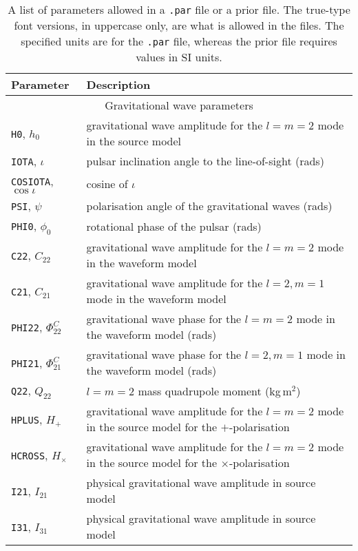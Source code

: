 \begin{longtable}{l|l}
\caption{A list of parameters allowed in a {\tt .par} file or a prior file. The true-type font versions, in uppercase only,
are what is allowed in the files. The specified units are for the {\tt .par} file, whereas the prior file
requires values in SI units.}\label{tab:paramlist} \\
Parameter & Description \\
\hline
\multicolumn{2}{c}{Gravitational wave parameters} \\
\hline
{\tt H0}, $h_0$      & gravitational wave amplitude for the $l=m=2$ mode in the source model \\
{\tt IOTA}, $\iota$  & pulsar inclination angle to the line-of-sight (rads) \\
{\tt COSIOTA}, $\cos{\iota}$ & cosine of $\iota$ \\
{\tt PSI}, $\psi$    & polarisation angle of the gravitational waves (rads) \\
{\tt PHI0}, $\phi_0$ & rotational phase of the pulsar (rads) \\
{\tt C22}, $C_{22}$  & gravitational wave amplitude for the $l=m=2$ mode in the waveform model \citep[see][]{2015MNRAS.453.4399P} \\
{\tt C21}, $C_{21}$  & gravitational wave amplitude for the $l=2, m=1$ mode in the waveform model \citep[see][]{2015MNRAS.453.4399P} \\
{\tt PHI22}, $\Phi_{22}^C$ & gravitational wave phase for the $l=m=2$ mode in the waveform model (rads) \citep[see][]{2015MNRAS.453.4399P} \\
{\tt PHI21}, $\Phi_{21}^C$ & gravitational wave phase for the $l=2, m=1$ mode in the waveform model (rads) \citep[see][]{2015MNRAS.453.4399P} \\
{\tt Q22}, $Q_{22}$ & $l=m=2$ mass quadrupole moment (kg\,m$^{2}$) \citep[see e.g.][]{2005PhRvL..95u1101O} \\
{\tt HPLUS}, $H_+$ &  gravitational wave amplitude for the $l=m=2$ mode in the source model for the $+$-polarisation \\
{\tt HCROSS}, $H_{\times}$ &  gravitational wave amplitude for the $l=m=2$ mode in the source model for the $\times$-polarisation \\
{\tt I21}, $I_{21}$ & physical gravitational wave amplitude in source model \citep[see][]{2015MNRAS.453.4399P} \\
{\tt I31}, $I_{31}$ & physical gravitational wave amplitude in source model \citep[see][]{2015MNRAS.453.4399P} \\

\end{longtable}
